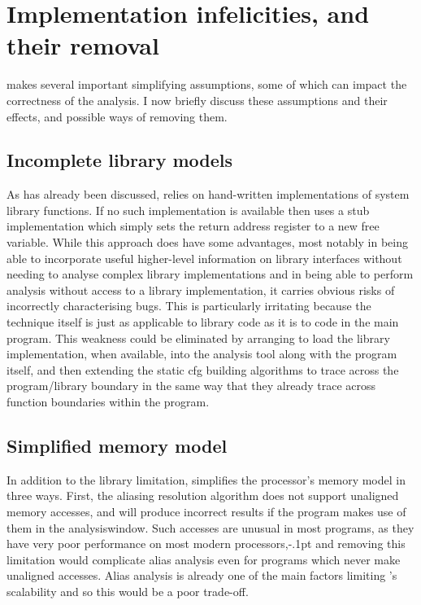\section{Implementation infelicities, and their removal}
{\Implementation} makes several important simplifying assumptions,
some of which can impact the correctness of the analysis.  I now
briefly discuss these assumptions and their effects, and possible ways
of removing them.

\subsection{Incomplete library models}
As has already been discussed, {\implementation} relies on
hand-written {\StateMachine} implementations of system library
functions.  If no such implementation is available then
{\implementation} uses a stub implementation which simply sets the
return address register to a new free variable.  While this approach
does have some advantages, most notably in being able to incorporate
useful higher-level information on library interfaces without needing
to analyse complex library implementations and in being able to
perform analysis without access to a library implementation, it
carries obvious risks of incorrectly characterising bugs.  This is
particularly irritating because the {\technique} technique itself is
just as applicable to library code as it is to code in the main
program.  This weakness could be eliminated by arranging to load the
library implementation, when available, into the {\implementation}
analysis tool along with the program itself, and then extending the
\gls{static cfg} building algorithms to trace across the
program/library boundary in the same way that they already trace
across function boundaries within the program.

\subsection{Simplified memory model}
\label{sect:derive:simpl_mem_model}

In addition to the library limitation, {\implementation} simplifies
the processor's memory model in three ways.  First, the aliasing
resolution algorithm does not support unaligned memory accesses, and
will produce incorrect results if the program makes use of them in the
\gls{analysiswindow}.  Such accesses are unusual in most programs, as
they have very poor performance on most modern
processors,\kern-.1pt and removing this limitation would
complicate alias analysis even for programs which never make unaligned
accesses.  Alias analysis is already one of the main factors limiting
{\implementation}'s scalability and so this would be a poor trade-off.


